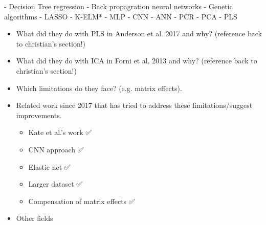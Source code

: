 - Decision Tree regression
- Back propagration neural networks
- Genetic algorithms
- LASSO
- K-ELM*
- MLP
- CNN
- ANN
- PCR
- PCA
- PLS


\begin{itemize}
	\item What did they do with PLS in Anderson et al. 2017 and why? (reference back to christian's section!)
	\item What did they do with ICA in Forni et al. 2013 and why? (reference back to christian's section!)
	\item Which limitations do they face? (e.g. matrix effects).
	\item Related work since 2017 that has tried to address these limitations/suggest improvements.
	\begin{itemize}
		\item Kate et al.'s work ✅
		\item CNN approach ✅
		\item Elastic net ✅
		\item Larger dataset ✅
		\item Compensation of matrix effects ✅
	\end{itemize}
	\item Other fields
\end{itemize}
